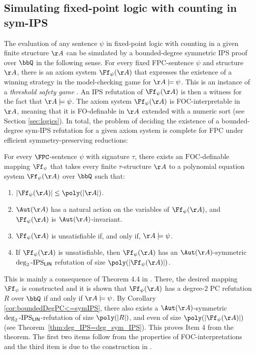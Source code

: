 \documentclass[a4paper,UKenglish,cleveref, autoref, thm-restate]{lipics-v2021}
\newcommand{\IPSlin}{\text{\upshape IPS}_{\mathsf{LIN}}}
\begin{document}
\subsection{Simulating fixed-point logic with counting in sym-IPS}
The evaluation of any sentence $\psi$ in fixed-point logic with counting in a given finite structure $\AA$ can be simulated by a bounded-degree symmetric IPS proof over $\bbQ$ in the following sense. For every fixed FPC-sentence $\psi$ and structure $\AA$, there is an axiom system $\Ff_\psi(\AA)$ that expresses the existence of a winning strategy in the model-checking game for $\AA \models \psi$. This is an instance of a \emph{threshold safety game} \cite{threshold_games_FPC}.
An IPS refutation of $\Ff_\psi(\AA)$ is then a witness for the fact that $\AA \models \psi$. 
The axiom system $\Ff_\psi(\AA)$ is FOC-interpretable in $\AA$, meaning that it is FO-definable in $\AA$ extended with a numeric sort (see Section \ref{sec:logics}). In total, the problem of deciding the existence of a bounded-degree sym-IPS refutation for a given axiom system is complete for FPC under efficient symmetry-preserving reductions:
\begin{theorem}
	\label{thm:simulateFPCinIPS}
	For every $\FPC$-sentence $\psi$ with signature $\tau$, there exists an $\mathrm{FOC}$-definable mapping $\Ff_\psi$ that takes every finite $\tau$-structure $\AA$ to a polynomial equation system $\Ff_\psi(\AA)$ over $\bbQ$ such that:
	\begin{enumerate}
		\item $|\Ff_\psi(\AA)| \leq \poly(|\AA|)$.
		\item $\Aut(\AA)$ has a natural action on the variables of $\Ff_\psi(\AA)$, and $\Ff_\psi(\AA)$ is $\Aut(\AA)$-invariant. 
		\item $\Ff_\psi(\AA)$ is unsatisfiable if, and only if, $\AA \models \psi$.
		\item If $\Ff_\psi(\AA)$ is unsatisfiable, then $\Ff_\psi(\AA)$ has an $\Aut(\AA)$-symmetric $\deg_2\text{-}\IPSlin$ refutation of size $\poly(|\Ff_\psi(\AA)|)$.
	\end{enumerate}	
\end{theorem}	
This is mainly a consequence of Theorem 4.4 in \cite{ggpp}. There, the desired mapping $\Ff_\psi$ is constructed and it is shown that $\Ff_\psi(\AA)$ has a degree-$2$ PC refutation $R$ over $\bbQ$ if and only if $\AA \models \psi$. 
By Corollary \ref{cor:boundedDegPC<=symIPS}, there also exists a $\Aut(\AA)$-symmetric $\deg_2\text{-}\IPSlin$-refutation of size $\poly(|R|)$, and even of size $\poly(|\Ff_\psi(\AA)|)$ (see Theorem~\ref{thm:deg_IPS=deg_sym_IPS}). This proves Item 4 from the theorem. The first two items follow from the properties of FOC-interpretations and the third item is due to the construction in \cite{ggpp}.
\end{document}
